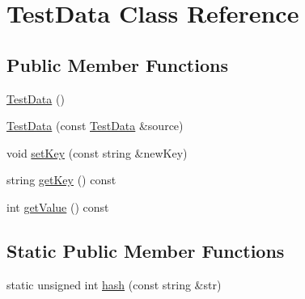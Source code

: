 \hypertarget{class_test_data}{\section{Test\-Data Class Reference}
\label{class_test_data}
}
\subsection*{Public Member Functions}
\begin{DoxyCompactItemize}
\item 
\hyperlink{class_test_data_aa4a3dd519ba3a3ae02956b627d42d123}{Test\-Data} ()
\item 
\hyperlink{class_test_data_af0a057dcb8eb1ec6926627c7f23627c0}{Test\-Data} (const \hyperlink{class_test_data}{Test\-Data} \&source)
\item 
void \hyperlink{class_test_data_a72cb0d5febcf77e8a6dd494fa6dff411}{set\-Key} (const string \&new\-Key)
\item 
string \hyperlink{class_test_data_ae20d0a4c5fba891d728c68ac4ec79654}{get\-Key} () const 
\item 
int \hyperlink{class_test_data_af33e667b6962f8a351f7a660a1a24c5e}{get\-Value} () const 
\end{DoxyCompactItemize}
\subsection*{Static Public Member Functions}
\begin{DoxyCompactItemize}
\item 
static unsigned int \hyperlink{class_test_data_a55f0e2851aa330be9921303107982f98}{hash} (const string \&str)
\end{DoxyCompactItemize}


